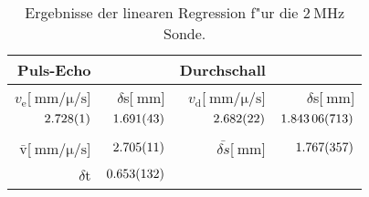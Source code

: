 \begin{table}[!h]
\begin{center}
\begin{tabular}{|r|r|r|r|}
\hline
Puls-Echo & & Durchschall & \\
\hline
\hline
$v_\mathrm{e}$[$\SI{}{\milli\meter\per\micro\per\second}$] & $\delta$s[$\SI{}{\milli\meter}$] & $v_\mathrm{d}$[$\SI{}{\milli\meter\per\micro\per\second}$]& $\delta$s[$\SI{}{\milli\meter}$]\\
\hline
$\SI{2.728 (1)}{}$ & $\SI{1.691 (43)}{}$ & $\SI{2.682 (22)}{}$ & $\SI{1.84306 (713)}{}$\\
\hline
\hline
&&&\\
$\bar{\mathrm{v}}$[$\SI{}{\milli\meter\per\micro\per\second}$] & $\SI{2.705 (11)}{}$ & $\bar{\delta s}$[$\SI{}{\milli\meter}$] & $\SI{1.767 (357)}{}$\\
\hline
$\delta$t & $\SI{0.653 (132)}{}$ &&\\
\hline
\end{tabular}
\caption[]{Ergebnisse der linearen Regression f"ur die $\SI{2}{\mega\hertz}$ Sonde.}
\label{r2}
\end{center}
\end{table}